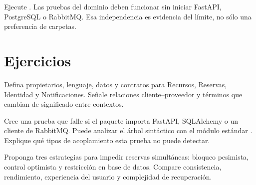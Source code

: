 \begin{validacion}
Ejecute . Las pruebas del dominio deben funcionar sin iniciar FastAPI, PostgreSQL o RabbitMQ. Esa independencia es evidencia del límite, no sólo una preferencia de carpetas.
\end{validacion}

\section{Ejercicios}
\begin{ejercicio}[title={Ejercicio 1. Mapa de contextos}]
Defina propietarios, lenguaje, datos y contratos para Recursos, Reservas, Identidad y Notificaciones. Señale relaciones cliente--proveedor y términos que cambian de significado entre contextos.
\end{ejercicio}

\begin{ejercicio}[title={Ejercicio 2. Prueba de frontera}]
Cree una prueba que falle si el paquete  importa FastAPI, SQLAlchemy o un cliente de RabbitMQ. Puede analizar el árbol sintáctico con el módulo estándar . Explique qué tipos de acoplamiento esta prueba no puede detectar.
\end{ejercicio}

\begin{ejercicio}[title={Ejercicio 3. Concurrencia}]
Proponga tres estrategias para impedir reservas simultáneas: bloqueo pesimista, control optimista y restricción en base de datos. Compare consistencia, rendimiento, experiencia del usuario y complejidad de recuperación.
\end{ejercicio}

